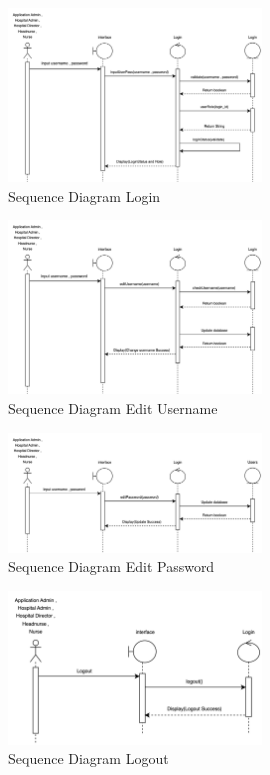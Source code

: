 \begin{figure}[h]
    \centering
    \includegraphics[width=0.6\textwidth]{Sequence 1.1.png}
    \caption{Sequence Diagram Login}
    \end{figure}

\begin{figure}[h]
    \centering
    \includegraphics[width=0.6\textwidth]{Sequence 1.2.png}
    \caption{Sequence Diagram Edit Username}
    \end{figure}

\begin{figure}[h]
    \centering
    \includegraphics[width=0.6\textwidth]{Sequence 1.2.1.png}
    \caption{Sequence Diagram Edit Password}
\end{figure}

\begin{figure}[h]
    \centering
    \includegraphics[width=0.6\textwidth]{Sequence 1.3.png}
    \caption{Sequence Diagram Logout}
    \end{figure}


